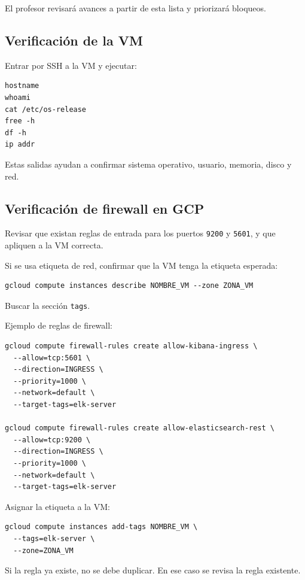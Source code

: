 \documentclass[
  coursetitle={Cómputo Nube y Tecnologías Emergentes},
  coursehours={96},
  coursedate={Verano 2026},
  doctype={Práctica},
  otherlangs={english,french},
  authorname={Lázaro},
  authorsurname={Bustio-Martínez},
  authortitle={PhD},
  role={Profesor Investigador},
  email={lbustio@inaoe.mx},
  phone={5559504000},
  ext={7459},
  institution={Instituto Nacional de Astrofísica, Óptica y Electrónica (INAOE)},
  department={Maestría en Ciencias en Tecnologías de Seguridad},
  address={Luis Enrique Erro 1, Sta. Ma. Tonantzintla, San Andrés Cholula, CP 72840, Puebla, México},
  margin={0.5in}
]{../../lbustio_lecture_notes}
\begin{document}
El profesor revisará avances a partir de esta lista y priorizará bloqueos.

\subsection{Verificación de la VM}

Entrar por SSH a la VM y ejecutar:

\begin{lstlisting}
hostname
whoami
cat /etc/os-release
free -h
df -h
ip addr
\end{lstlisting}

Estas salidas ayudan a confirmar sistema operativo, usuario, memoria, disco y red.

\subsection{Verificación de firewall en GCP}

Revisar que existan reglas de entrada para los puertos \texttt{9200} y \texttt{5601}, y que apliquen a la VM correcta.

Si se usa etiqueta de red, confirmar que la VM tenga la etiqueta esperada:

\begin{lstlisting}
gcloud compute instances describe NOMBRE_VM --zone ZONA_VM
\end{lstlisting}

Buscar la sección \texttt{tags}.

Ejemplo de reglas de firewall:

\begin{lstlisting}
gcloud compute firewall-rules create allow-kibana-ingress \
  --allow=tcp:5601 \
  --direction=INGRESS \
  --priority=1000 \
  --network=default \
  --target-tags=elk-server

gcloud compute firewall-rules create allow-elasticsearch-rest \
  --allow=tcp:9200 \
  --direction=INGRESS \
  --priority=1000 \
  --network=default \
  --target-tags=elk-server
\end{lstlisting}

Asignar la etiqueta a la VM:

\begin{lstlisting}
gcloud compute instances add-tags NOMBRE_VM \
  --tags=elk-server \
  --zone=ZONA_VM
\end{lstlisting}

Si la regla ya existe, no se debe duplicar. En ese caso se revisa la regla existente.
\end{document}
